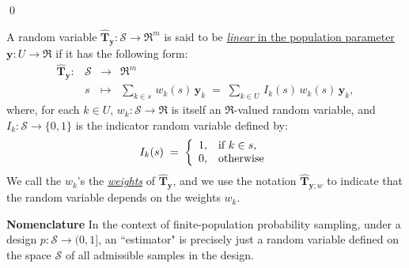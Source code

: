 \documentclass{article}
\begin{document}
\begin{enumerate}
\end{enumerate}
\qed

\begin{definition}
\mbox{}
\vskip 0.1cm
\noindent
A random variable $\widehat{\mathbf{T}}_{\mathbf{y}} : \mathcal{S} \longrightarrow \Re^{m}$
is said to be \underline{\emph{linear} in the population parameter $\mathbf{y} : U \longrightarrow \Re$}
if it has the following form:
\begin{equation*}
\begin{array}{cccl}
\widehat{\mathbf{T}}_{\mathbf{y}} : & \mathcal{S} & \longrightarrow & \Re^{m} \\
     & s &\longmapsto & \underset{k\in s}{\sum}\,w_{k}(s)\,\mathbf{y}_{k} \;=\; \underset{k\in U}{\sum}\,I_{k}(s)\,w_{k}(s)\,\mathbf{y}_{k},
\end{array}
\end{equation*}
where, for each $k \in U$, $w_{k} : \mathcal{S} \longrightarrow \Re$ is itself
an $\Re$-valued random variable, and $I_{k} : \mathcal{S} \longrightarrow \{0,1\}$
is the indicator random variable defined by:
\begin{equation*}
I_{k}(s)
\;=\;
\left\{
\begin{array}{cl}
1, & \textnormal{if $k \in s$}, \\
0, & \textnormal{otherwise}
\end{array}
\right.
\end{equation*}
We call the $w_{k}$'s the \underline{\emph{weights}} of $\widehat{\mathbf{T}}_{\mathbf{y}}$,
and we use the notation $\widehat{\mathbf{T}}_{\mathbf{y};w}$ to indicate that the random
variable depends on the weights $w_{k}$.
\end{definition}

\noindent
\textbf{Nomenclature}
\;
In the context of finite-population probability sampling, under a design
$p : \mathcal{S} \longrightarrow (0,1]$,
an ``estimator" is precisely just a random variable defined on the space
$\mathcal{S}$ of all admissible samples in the design.
\end{document}
